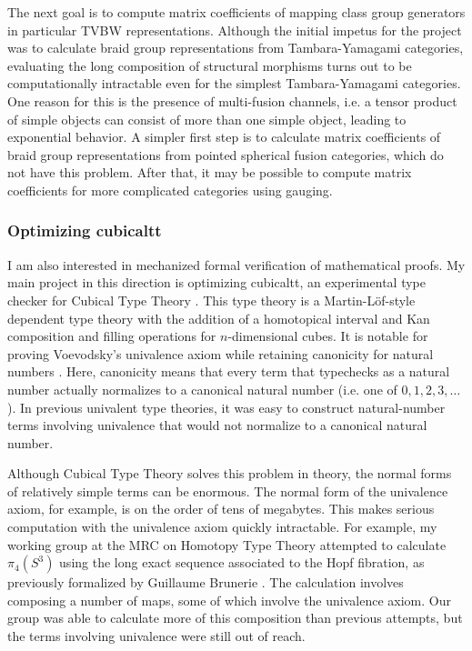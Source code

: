\documentclass[12pt]{article}
\theoremstyle{plain} \numberwithin{equation}{section}
\theoremstyle{definition}
\begin{document}
The next goal is to compute matrix coefficients of mapping class group generators in particular TVBW representations.   Although the initial impetus for the project was to calculate braid group representations from Tambara-Yamagami categories, evaluating the long composition of structural morphisms turns out to be computationally intractable even for the simplest Tambara-Yamagami categories.  One reason for this is the presence of multi-fusion channels, i.e. a tensor product of simple objects can consist of more than one simple object, leading to exponential behavior. A simpler first step is to calculate matrix coefficients of braid group representations from pointed spherical fusion categories, which do not have this problem.  After that, it may be possible to compute matrix coefficients for more complicated categories using gauging.

\subsubsection*{Optimizing cubicaltt} %
I am also interested in mechanized formal verification of mathematical proofs.  My main project in this direction is optimizing cubicaltt, an experimental type checker for Cubical Type Theory \cite{ctt1, ctt2} .  This type theory is a Martin-L\"of-style dependent type theory with the addition of a homotopical interval and Kan composition and filling operations for $n$-dimensional cubes.  It is notable for proving Voevodsky's univalence axiom while retaining canonicity for natural numbers \cite{h}.  Here, canonicity means that every term that typechecks as a natural number actually normalizes to a canonical natural number (i.e. one of $0, 1, 2, 3, \ldots$).  In previous univalent type theories, it was easy to construct natural-number terms involving univalence that would not normalize to a canonical natural number.


Although Cubical Type Theory solves this problem in theory, the normal forms of relatively simple terms can be enormous.  The normal form of the univalence axiom, for example, is on the order of tens of megabytes.  This makes serious computation with the univalence axiom quickly intractable.  For example, my working group at the MRC on Homotopy Type Theory attempted to calculate $\pi_4(S^3)$ using the long exact sequence associated to the Hopf fibration, as previously formalized by Guillaume Brunerie \cite{gb}.  The calculation involves composing a number of maps, some of which involve the univalence axiom.  Our group was able to calculate more of this composition than previous attempts, but the terms involving univalence were still out of reach.
\end{document}
